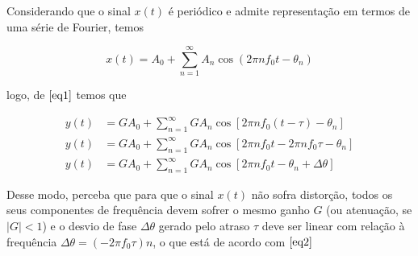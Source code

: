 \documentclass[11pt]{article}
\makeatletter
\newcommand{\boxspacing}{\kern\kvtcb@left@rule\kern\kvtcb@boxsep}
\newcommand{\prompt}[4]{
        \ttfamily\llap{{\color{#2}[#3]:\hspace{3pt}#4}}\vspace{-\baselineskip}
    }
\makeatother
\begin{document}
Considerando que o sinal \(x(t)\) é periódico e admite representação em
termos de uma série de Fourier, temos

\[
x(t)=A_{0} + \sum_{n=1}^{\infty} A_{n}\cos \left(2\pi n f_0 t-\theta_{n}\right)
\]

logo, de \(\eqref{eq1}\) temos que

\[
\begin{align}
y(t)&=GA_{0} + \sum_{n=1}^{\infty} GA_{n}\cos \left[2\pi n f_0 (t-\tau) -\theta_{n}\right]\\
y(t)&=GA_{0} + \sum_{n=1}^{\infty} GA_{n}\cos \left[2\pi n f_0 t -2\pi n f_0 \tau  -\theta_{n}\right]\\
y(t)&=GA_{0} + \sum_{n=1}^{\infty} GA_{n}\cos \left[2\pi n f_0 t -\theta_{n} + \Delta \theta\right]
\end{align}
\]

Desse modo, perceba que para que o sinal \(x(t)\) não sofra distorção,
todos os seus componentes de frequência devem sofrer o mesmo ganho \(G\)
(ou atenuação, se \(|G|<1\)) e o desvio de fase \(\Delta \theta\) gerado
pelo atraso \(\tau\) deve ser linear com relação à frequência
\(\Delta \theta = (-2\pi f_0 \tau)n\), o que está de acordo com
\(\eqref{eq2}\)

    \begin{tcolorbox}[breakable, size=fbox, boxrule=1pt, pad at break*=1mm,colback=cellbackground, colframe=cellborder]
\prompt{In}{incolor}{ }{\boxspacing}
\begin{Verbatim}[commandchars=\\\{\}]

\end{Verbatim}
\end{tcolorbox}


    
    
    
\end{document}
